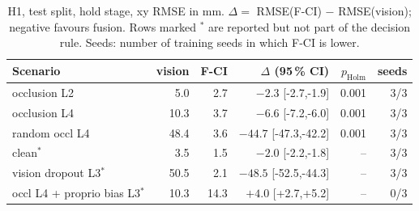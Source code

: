 \begin{table}[t]\centering\small\begin{tabular}{lrrrrr}\toprule
Scenario & vision & F-CI & $\Delta$ (95\,\% CI) & $p_{\mathrm{Holm}}$ & seeds \\\midrule
occlusion L2 & 5.0 & 2.7 & $-2.3$ [-2.7,-1.9] & 0.001 & 3/3 \\
occlusion L4 & 10.3 & 3.7 & $-6.6$ [-7.2,-6.0] & 0.001 & 3/3 \\
random occl L4 & 48.4 & 3.6 & $-44.7$ [-47.3,-42.2] & 0.001 & 3/3 \\
clean$^{*}$ & 3.5 & 1.5 & $-2.0$ [-2.2,-1.8] & -- & 3/3 \\
vision dropout L3$^{*}$ & 50.5 & 2.1 & $-48.5$ [-52.5,-44.3] & -- & 3/3 \\
occl L4 {+} proprio bias L3$^{*}$ & 10.3 & 14.3 & $+4.0$ [+2.7,+5.2] & -- & 0/3 \\
\bottomrule\end{tabular}\caption{H1, test split, hold stage, xy RMSE in mm. $\Delta=$ RMSE(F-CI) $-$ RMSE(vision); negative favours fusion. Rows marked $^{*}$ are reported but not part of the decision rule. Seeds: number of training seeds in which F-CI is lower.}\label{tab:h1}\end{table}
